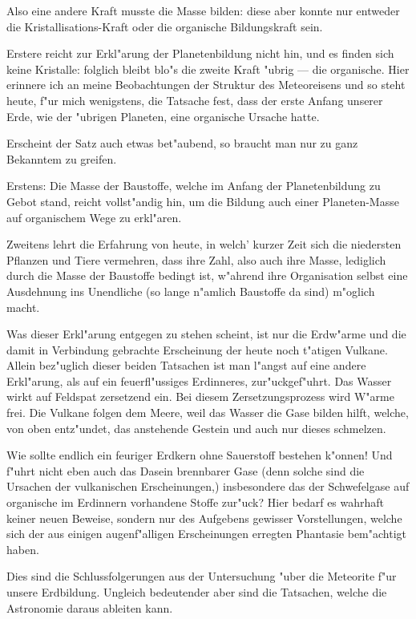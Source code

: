 \documentclass[a4paper, 11pt, oneside]{article}
\begin{document}
Also eine andere Kraft musste die Masse bilden: diese aber konnte nur entweder die Kristallisations-Kraft oder die organische Bildungskraft sein.

Erstere reicht zur Erkl"arung der Planetenbildung nicht hin, und es finden sich keine Kristalle: folglich bleibt blo"s die zweite Kraft "ubrig --- die organische. Hier erinnere ich an meine Beobachtungen der Struktur des Meteoreisens und so steht heute, f"ur mich wenigstens, die Tatsache fest, dass der erste Anfang unserer Erde, wie der "ubrigen Planeten, eine organische Ursache hatte.

Erscheint der Satz auch etwas bet"aubend, so braucht man nur zu ganz Bekanntem zu greifen.

Erstens: Die Masse der Baustoffe, welche im Anfang der Planetenbildung zu Gebot stand, reicht vollst"andig hin, um die Bildung auch einer Planeten-Masse auf organischem Wege zu erkl"aren.

Zweitens lehrt die Erfahrung von heute, in welch' kurzer Zeit sich die niedersten Pflanzen und Tiere vermehren, dass ihre Zahl, also auch ihre Masse, lediglich durch die Masse der Baustoffe bedingt ist, w"ahrend ihre Organisation selbst eine Ausdehnung ins Unendliche (so lange n"amlich Baustoffe da sind) m"oglich macht.

Was dieser Erkl"arung entgegen zu stehen scheint, ist nur die Erdw"arme und die damit in Verbindung gebrachte Erscheinung der heute noch t"atigen Vulkane. Allein bez"uglich dieser beiden Tatsachen ist man l"angst auf eine andere Erkl"arung, als auf ein feuerfl"ussiges Erdinneres, zur"uckgef"uhrt. Das Wasser wirkt auf Feldspat zersetzend ein. Bei diesem Zersetzungsprozess wird W"arme frei. Die Vulkane folgen dem Meere, weil das Wasser die Gase bilden hilft, welche, von oben entz"undet, das anstehende Gestein und auch nur dieses schmelzen.

Wie sollte endlich ein feuriger Erdkern ohne Sauerstoff bestehen k"onnen! Und f"uhrt nicht eben auch das Dasein brennbarer Gase (denn solche sind die Ursachen der vulkanischen Erscheinungen,) insbesondere das der Schwefelgase auf organische im Erdinnern vorhandene Stoffe zur"uck? Hier bedarf es wahrhaft keiner neuen Beweise, sondern nur des Aufgebens gewisser Vorstellungen, welche sich der aus einigen augenf"alligen Erscheinungen erregten Phantasie bem"achtigt haben.

Dies sind die Schlussfolgerungen aus der Untersuchung "uber die Meteorite f"ur unsere Erdbildung. Ungleich bedeutender aber sind die Tatsachen, welche die Astronomie daraus ableiten kann.
\end{document}
